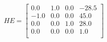 \documentclass[./\jobname.tex]{subfiles}
\begin{document}
\begin{equation}
\label{eq:HE}
HE = 
\begin{bmatrix}
0.0  & 1.0 & 0.0 & -28.5 \\ 
-1.0 & 0.0 & 0.0 & 45.0 \\
0.0  & 0.0 & 1.0 & 28.0 \\ 
0.0  & 0.0 & 0.0 & 1.0 \\
\end{bmatrix}
\end{equation}

\begin{figure}[h]
	\centering
	\noindent{}
	\label{fig:hand_eye_coord}
\end{figure}
\end{document}
